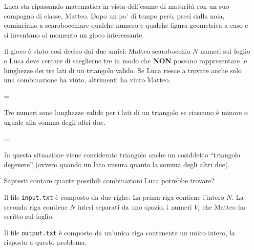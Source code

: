 \usepackage{xcolor}
\usepackage{afterpage}
\usepackage{pifont,mdframed}
\usepackage[bottom]{footmisc}
\usepackage{hyperref}

\makeatletter
\gdef\this@inputfilename{input.txt}
\gdef\this@outputfilename{output.txt}
\makeatother

\newcommand{\inputfile}{\texttt{input.txt}}
\newcommand{\outputfile}{\texttt{output.txt}}

\newenvironment{warning}
  {\par\begin{mdframed}[linewidth=2pt,linecolor=gray]%
    \begin{list}{}{\leftmargin=1cm
                   \labelwidth=\leftmargin}\item[\Large\ding{43}]}
  {\end{list}\end{mdframed}\par}

    Luca sta ripassando matematica in vista dell'esame di maturità con un suo compagno di classe, Matteo. Dopo un po' di tempo però, presi dalla noia, cominciano a scarabocchiare qualche numero e qualche figura geometrica a caso e si inventano al momento un gioco interessante.

    Il gioco è stato così deciso dai due amici: Matteo scarabocchia $N$ numeri sul foglio e Luca deve cercare di sceglierne tre in modo che \textbf{NON} possano rappresentare le lunghezze dei tre lati di un triangolo valido. Se Luca riesce a trovare anche solo una combinazione ha vinto, altrimenti ha vinto Matteo.

    \begin{warning}
        Tre numeri sono lunghezze valide per i lati di un triangolo se ciascuno è minore o uguale alla somma degli altri due.
    \end{warning}
    \begin{warning}
        In questa situazione viene considerato triangolo anche un cosiddetto ``triangolo degenere'' (ovvero quando un lato misura quanto la somma degli altri due).
    \end{warning}

    Sapresti contare quante possibili combinazioni Luca potrebbe trovare?


\InputFile
Il file \inputfile{} è composto da due righe. La prima riga contiene l'intero $N$. La seconda riga contiene $N$ interi separati da uno spazio, i numeri $V_i$ che Matteo ha scritto sul foglio.

\OutputFile
Il file \outputfile{} è composto da un'unica riga contenente un unico intero, la risposta a questo problema.

